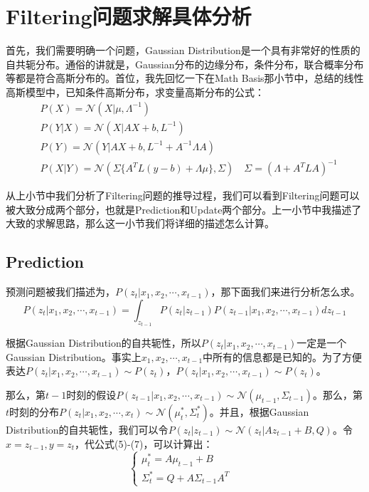 \documentclass[a4paper]{article}
\begin{document}
\section{Filtering问题求解具体分析}
首先，我们需要明确一个问题，Gaussian Distribution是一个具有非常好的性质的{\color{red}自共轭分布}。通俗的讲就是，Gaussian分布的边缘分布，条件分布，联合概率分布等都是符合高斯分布的。首位，我先回忆一下在Math Basis那小节中，总结的线性高斯模型中，已知条件高斯分布，求变量高斯分布的公式：
\begin{align}
    & P(X) = \mathcal{N}(X|\mu,\Lambda^{-1}) \\
    & P(Y|X) = \mathcal{N}(X|AX+b,L^{-1}) \\
    & P(Y) = \mathcal{N}(Y|AX+b,L^{-1}+A^{-1}\Lambda A) \\
    & P(X|Y) = \mathcal{N}(\Sigma\{ A^TL(y-b)+\Lambda\mu \}, \Sigma) \quad \Sigma = (\Lambda + A^TLA)^{-1}
\end{align}

从上小节中我们分析了Filtering问题的推导过程，我们可以看到Filtering问题可以被大致分成两个部分，也就是Prediction和Update两个部分。上一小节中我描述了大致的求解思路，那么这一小节我们将详细的描述怎么计算。

\subsection{Prediction}
预测问题被我们描述为，$P(z_t|x_1,x_2,\cdots,x_{t-1})$，那下面我们来进行分析怎么求。
\begin{equation}
    P(z_t|x_1,x_2,\cdots,x_{t-1}) = \int_{z_{t-1}} P(z_t|z_{t-1}) P(z_{t-1}|x_1,x_2,\cdots,x_{t-1}) dz_{t-1}
\end{equation}

根据Gaussian Distribution的自共轭性，所以$P(z_t|x_1,x_2,\cdots,x_{t-1})$一定是一个Gaussian Distribution。事实上$x_1,x_2,\cdots,x_{t-1}$中所有的信息都是已知的。为了方便表达$P(z_t|x_1,x_2,\cdots,x_{t-1}) \sim P(z_t)$，$P(z_t|x_1,x_2,\cdots,x_{t-1}) \sim P(z_t)$。

那么，第$t-1$时刻的假设$P(z_{t-1}|x_1,x_2,\cdots,x_{t-1}) \sim \mathcal{N}(\mu_{t-1},\Sigma_{t-1})$。那么，第$t$时刻的分布$P(z_{t}|x_1,x_2,\cdots,x_{t}) \sim \mathcal{N}(\mu_{t}^\ast,\Sigma_{t}^\ast)$。并且，根据Gaussian Distribution的自共轭性，我们可以令$P(z_t|z_{t-1})\sim \mathcal{N}(z_t|Az_{t-1}+B,Q)$。令$x=z_{t-1},y=z_{t}$，代公式(5)-(7)，可以计算出：
\begin{equation}
    \left\{
    \begin{array}{ll}
        \mu_{t}^\ast = A\mu_{t-1}+B & \\
        \Sigma_{t}^\ast = Q+A\Sigma_{t-1}A^T
    \end{array}
    \right.
\end{equation}
\end{document}
